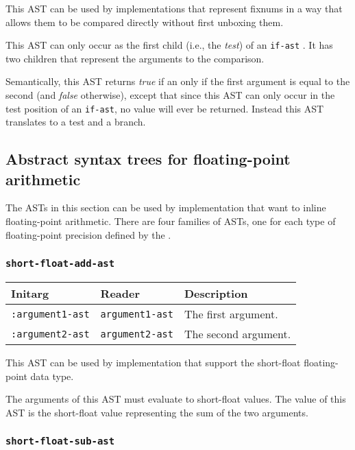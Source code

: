 This AST can be used by implementations that represent fixnums in a
way that allows them to be compared directly without first unboxing
them.

This AST can only occur as the first child (i.e., the \emph{test}) of
an \texttt{if-ast} .  It has two children that
represent the arguments to the comparison.  

Semantically, this AST returns \emph{true} if an only if the first
argument is equal to the second (and \emph{false} otherwise), except
that since this AST can only occur in the test position of an
\texttt{if-ast}, no value will ever be returned.  Instead this AST
translates to a test and a branch.

\subsection{Abstract syntax trees for floating-point arithmetic}
\label{sec-ast-floating-point-arithmetic}

The ASTs in this section can be used by implementation that want to
inline floating-point arithmetic.  There are four families of ASTs,
one for each type of floating-point precision defined by the \hs{}.

\subsubsection{\texttt{short-float-add-ast}}
\label{sec-ast-short-float-add}

\begin{tabular}{|l|l|l|}
\hline
Initarg & Reader & Description\\
\hline\hline
\texttt{:argument1-ast} & \texttt{argument1-ast} & The first argument.\\
\hline
\texttt{:argument2-ast} & \texttt{argument2-ast} & The second argument.\\
\hline
\end{tabular}

This AST can be used by implementation that support the short-float
floating-point data type.  

The arguments of this AST must evaluate to short-float
values.  The value of this AST is the short-float value
representing the sum of the two arguments.

\subsubsection{\texttt{short-float-sub-ast}}
\label{sec-ast-short-float-sub}

